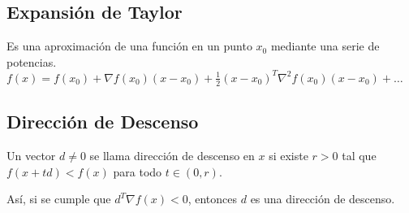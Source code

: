 \documentclass{article}
\begin{document}
\subsection*{Expansión de Taylor}

Es una aproximación de una función en un punto $x_0$ mediante una serie de potencias. $f(x) = f(x_0) + \nabla f(x_0) (x - x_0) + \frac{1}{2} (x - x_0)^T \nabla^2 f(x_0) (x - x_0) + \ldots$

\subsection*{Dirección de Descenso}

Un vector $d\neq 0$ se llama dirección de descenso en $x$ si existe $r > 0$ tal que $f(x + td) < f(x)$ para todo $t \in (0, r)$.

Así, si se cumple que $d^T\nabla f(x) < 0$, entonces $d$ es una dirección de descenso.
\end{document}
